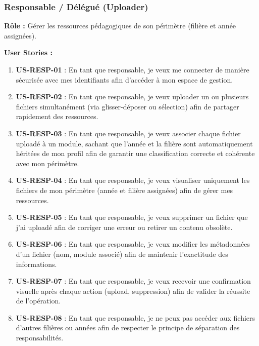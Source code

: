 \documentclass[12pt,a4paper]{article}
\begin{document}
\subsubsection{Responsable / Délégué (Uploader)}

\textbf{Rôle :} Gérer les ressources pédagogiques de son périmètre (filière et année assignées).

\textbf{User Stories :}
\begin{enumerate}[leftmargin=*]
    \item \textbf{US-RESP-01} : En tant que responsable, je veux me connecter de manière sécurisée avec mes identifiants afin d'accéder à mon espace de gestion.
    
    \item \textbf{US-RESP-02} : En tant que responsable, je veux uploader un ou plusieurs fichiers simultanément (via glisser-déposer ou sélection) afin de partager rapidement des ressources.
    
    \item \textbf{US-RESP-03} : En tant que responsable, je veux associer chaque fichier uploadé à un module, sachant que l'année et la filière sont automatiquement héritées de mon profil afin de garantir une classification correcte et cohérente avec mon périmètre.
    
    \item \textbf{US-RESP-04} : En tant que responsable, je veux visualiser uniquement les fichiers de mon périmètre (année et filière assignées) afin de gérer mes ressources.
    
    \item \textbf{US-RESP-05} : En tant que responsable, je veux supprimer un fichier que j'ai uploadé afin de corriger une erreur ou retirer un contenu obsolète.
    
    \item \textbf{US-RESP-06} : En tant que responsable, je veux modifier les métadonnées d'un fichier (nom, module associé) afin de maintenir l'exactitude des informations.
    
    \item \textbf{US-RESP-07} : En tant que responsable, je veux recevoir une confirmation visuelle après chaque action (upload, suppression) afin de valider la réussite de l'opération.
    
    \item \textbf{US-RESP-08} : En tant que responsable, je ne peux pas accéder aux fichiers d'autres filières ou années afin de respecter le principe de séparation des responsabilités.
\end{enumerate}
\end{document}
